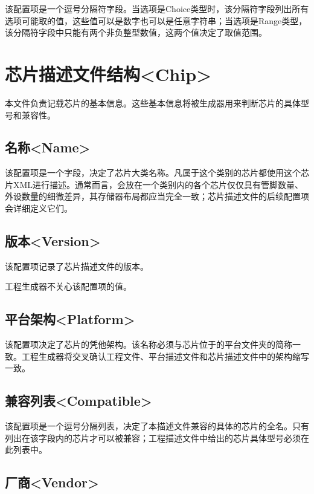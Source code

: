 该配置项是一个逗号分隔符字段。当选项是Choice类型时，该分隔符字段列出所有选项可能取的值，这些值可以是数字也可以是任意字符串；当选项是Range类型，该分隔符字段中只能有两个非负整型数值，这两个值决定了取值范围。


\section{芯片描述文件结构<Chip>{}}\label{sec:5-5}

本文件负责记载芯片的基本信息。这些基本信息将被生成器用来判断芯片的具体型号和兼容性。

\subsection{名称<Name>{}}\label{subsec:5-5-1}

该配置项是一个字段，决定了芯片大类名称。凡属于这个类别的芯片都使用这个芯片XML进行描述。通常而言，会放在一个类别内的各个芯片仅仅具有管脚数量、外设数量的细微差异，其存储器布局都应当完全一致；芯片描述文件的后续配置项会详细定义它们。

\subsection{版本<Version>{}}\label{subsec:5-5-2}

该配置项记录了芯片描述文件的版本。

工程生成器不关心该配置项的值。

\subsection{平台架构<Platform>{}}\label{subsec:5-5-3}

该配置项决定了芯片的凭他架构。该名称必须与芯片位于的平台文件夹的简称一致。工程生成器将交叉确认工程文件、平台描述文件和芯片描述文件中的架构缩写一致。

\subsection{兼容列表<Compatible>{}}\label{subsec:5-5-4}

该配置项是一个逗号分隔列表，决定了本描述文件兼容的具体的芯片的全名。只有列出在该字段内的芯片才可以被兼容；工程描述文件中给出的芯片具体型号必须在此列表中。

\subsection{厂商<Vendor>{}}\label{subsec:5-5-5}

